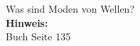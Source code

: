 \begin{question}[section=5,subsection=52,name={Moden von Wellen},difficulty=7,type=mdl,mode=exm,tags={}]
	Was sind Moden von Wellen?
	\\ \textbf{Hinweis:}\\
	Buch Seite 135
\end{question}
\begin{solution}
	
\end{solution}